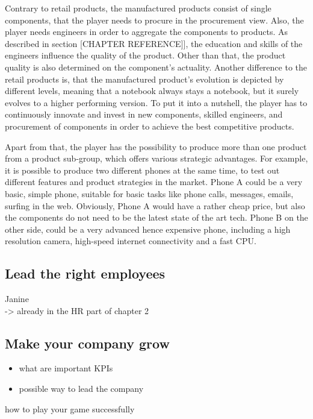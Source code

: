 \documentclass[11pt,titlepage,oneside,openany]{book}
\begin{document}
Contrary to retail products, the manufactured products consist of single components, that the player needs to procure in the procurement view. Also, the player needs engineers in order to aggregate the components to products. As described in section [CHAPTER REFERENCE]], the education and skills of the engineers influence the quality of the product. Other than that, the product quality is also determined on the component's actuality. Another difference to the retail products is, that the manufactured product's evolution is depicted by different levels, meaning that a notebook always stays a notebook, but it surely evolves to a higher performing version. To put it into a nutshell, the player has to continuously innovate and invest in new components, skilled engineers, and procurement of components in order to achieve the best competitive products. 

Apart from that, the player has the possibility to produce more than one product from a product sub-group, which offers various strategic advantages. For example, it is possible to produce two different phones at the same time, to test out different features and product strategies in the market. Phone A could be a very basic, simple phone, suitable for basic tasks like phone calls, messages, emails, surfing in the web. Obviously, Phone A would have a rather cheap price, but also the components do not need to be the latest state of the art tech. Phone B on the other side, could be a very advanced hence expensive phone, including a high resolution camera, high-speed internet connectivity and a fast CPU.

\subsection{Lead the right employees}
Janine \\
-> already in the HR part of chapter 2

\subsection{Make your company grow}
\begin{itemize}
    \item what are important KPIs
    \item possible way to lead the company
\end{itemize}
how to play your game successfully
\end{document}
